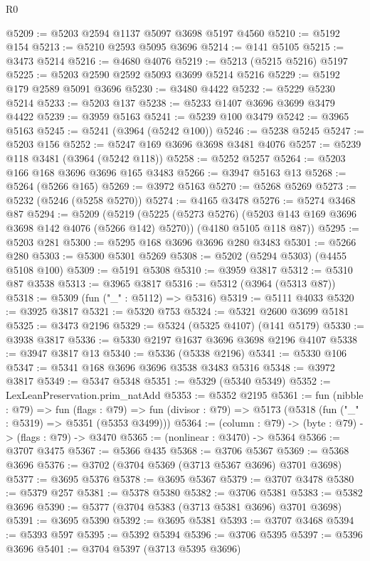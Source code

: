 \begin{lexlean}{R0}
\begin{coremodule}
@5209 := @5203 @2594 @1137 @5097 @3698 @5197 @4560
@5210 := @5192 @154
@5213 := @5210 @2593 @5095 @3696
@5214 := @141 @5105
@5215 := @3473 @5214
@5216 := @4680 @4076
@5219 := @5213 (@5215 @5216) @5197
@5225 := @5203 @2590 @2592 @5093 @3699 @5214 @5216
@5229 := @5192 @179 @2589 @5091 @3696
@5230 := @3480 @4422
@5232 := @5229 @5230 @5214
@5233 := @5203 @137
@5238 := @5233 @1407 @3696 @3699 @3479 @4422
@5239 := @3959 @5163
@5241 := @5239 @100 @3479
@5242 := @3965 @5163
@5245 := @5241 (@3964 (@5242 @100))
@5246 := @5238 @5245
@5247 := @5203 @156
@5252 := @5247 @169 @3696 @3698 @3481 @4076
@5257 := @5239 @118 @3481 (@3964 (@5242 @118))
@5258 := @5252 @5257
@5264 := @5203 @166 @168 @3696 @3696 @165 @3483
@5266 := @3947 @5163 @13
@5268 := @5264 (@5266 @165)
@5269 := @3972 @5163
@5270 := @5268 @5269
@5273 := @5232 (@5246 (@5258 @5270))
@5274 := @4165 @3478
@5276 := @5274 @3468 @87
@5294 := @5209
    (@5219
      (@5225 (@5273 @5276) (@5203 @143 @169 @3696 @3698 @142 @4076 (@5266 @142) @5270))
      (@4180 @5105 @118 @87))
@5295 := @5203 @281
@5300 := @5295 @168 @3696 @3696 @280 @3483
@5301 := @5266 @280
@5303 := @5300 @5301 @5269
@5308 := @5202 (@5294 @5303) (@4455 @5108 @100)
@5309 := @5191 @5308
@5310 := @3959 @3817
@5312 := @5310 @87 @3538
@5313 := @3965 @3817
@5316 := @5312 (@3964 (@5313 @87))
@5318 := @5309 (fun ("_" : @5112) => @5316)
@5319 := @5111 @4033
@5320 := @3925 @3817
@5321 := @5320 @753
@5324 := @5321 @2600 @3699 @5181
@5325 := @3473 @2196
@5329 := @5324 (@5325 @4107) (@141 @5179)
@5330 := @3938 @3817
@5336 := @5330 @2197 @1637 @3696 @3698 @2196 @4107
@5338 := @3947 @3817 @13
@5340 := @5336 (@5338 @2196)
@5341 := @5330 @106
@5347 := @5341 @168 @3696 @3696 @3538 @3483 @5316
@5348 := @3972 @3817
@5349 := @5347 @5348
@5351 := @5329 (@5340 @5349)
@5352 := LexLeanPreservation.prim_natAdd
@5353 := @5352 @2195
@5361 := fun (nibble : @79) =>
  fun (flags : @79) =>
  fun (divisor : @79) => @5173 (@5318 (fun ("_" : @5319) => @5351 (@5353 @3499)))
@5364 := (column : @79) -> (byte : @79) -> (flags : @79) -> @3470
@5365 := (nonlinear : @3470) -> @5364
@5366 := @3707 @3475
@5367 := @5366 @435
@5368 := @3706 @5367
@5369 := @5368 @3696
@5376 := @3702 (@3704 @5369 (@3713 @5367 @3696) @3701 @3698)
@5377 := @3695 @5376
@5378 := @3695 @5367
@5379 := @3707 @3478
@5380 := @5379 @257
@5381 := @5378 @5380
@5382 := @3706 @5381
@5383 := @5382 @3696
@5390 := @5377 (@3704 @5383 (@3713 @5381 @3696) @3701 @3698)
@5391 := @3695 @5390
@5392 := @3695 @5381
@5393 := @3707 @3468
@5394 := @5393 @597
@5395 := @5392 @5394
@5396 := @3706 @5395
@5397 := @5396 @3696
@5401 := @3704 @5397 (@3713 @5395 @3696)

\end{coremodule}
\end{lexlean}
